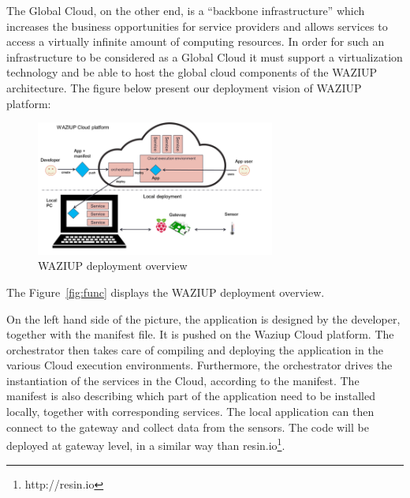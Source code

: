 The Global Cloud, on the other end, is a “backbone infrastructure” which increases the business opportunities for service providers and allows services to access a virtually infinite amount of computing resources. 
In order for such an infrastructure to be considered as a Global Cloud it must support a virtualization technology and be able to host the global cloud components of the WAZIUP architecture.
The figure below present our deployment vision of WAZIUP platform:

\begin{figure}[h!]
\centering
\includegraphics[width=0.7\textwidth]{figs/deploy.png}
\caption{WAZIUP deployment overview}
\label{fig:deploy}
\end{figure}

The Figure~\ref{fig:func} displays the WAZIUP deployment overview.

On the left hand side of the picture, the application is designed by the developer, together with the manifest file. 
It is pushed on the Waziup Cloud platform. The orchestrator then takes care of compiling and deploying the application in the various Cloud execution environments. 
Furthermore, the orchestrator drives the instantiation of the services in the Cloud, according to the manifest. 
The manifest is also describing which part of the application need to be installed locally, together with corresponding services. 
The local application can then connect to the gateway and collect data from the sensors.
The code will be deployed at gateway level, in a similar way than resin.io\footnote{http://resin.io}.


